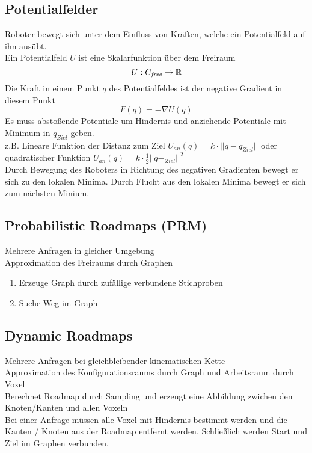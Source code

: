 \subsection{Potentialfelder}%
\label{bwp:sub:potentialfelder}
Roboter bewegt sich unter dem Einfluss von Kräften, welche ein Potentialfeld auf ihn ausübt.\\
Ein Potentialfeld \(U\) ist eine Skalarfunktion über dem Freiraum \[U: C_{\mathit{free}} \rightarrow \mathbb{R}\]
Die Kraft in einem Punkt \(q\) des Potentialfeldes ist der negative Gradient in diesem Punkt
\[F(q) = - \nabla U(q)\]
Es muss abstoßende Potentiale um Hindernis und anziehende Potentiale mit Minimum in \(q_{\mathit{Ziel}}\) geben.\\
z.B. Lineare Funktion der Distanz zum Ziel \( U_{\mathit{an}}(q) = k \cdot || q - q_{\mathit{Ziel}} ||\)
oder quadratischer Funktion \(U_{\mathit{an}}(q) = k \cdot \frac{1}{2} {|| q - _{\mathit{Ziel}}||}^2\)\\
Durch Bewegung des Roboters in Richtung des negativen Gradienten bewegt er sich zu den lokalen Minima.
Durch Flucht aus den lokalen Minima bewegt er sich zum nächsten Minium.


\subsection{Probabilistic Roadmaps (PRM)}%
\label{bwp:sub:probabilistic-roadmaps}
Mehrere Anfragen in gleicher Umgebung\\
Approximation des Freiraums durch Graphen
\begin{enumerate}
\item Erzeuge Graph durch zufällige verbundene Stichproben
\item Suche Weg im Graph
\end{enumerate}

\subsection{Dynamic Roadmaps}%
\label{bwp:sub:dynamic-roadmaps}
Mehrere Anfragen bei gleichbleibender kinematischen Kette\\
Approximation des Konfigurationsraums durch Graph und Arbeitsraum durch Voxel\\

Berechnet Roadmap durch Sampling und erzeugt eine Abbildung zwichen den Knoten/Kanten und allen Voxeln\\
Bei einer Anfrage müssen alle Voxel mit Hindernis bestimmt werden und die Kanten / Knoten aus der Roadmap entfernt werden.
Schließlich werden Start und Ziel im Graphen verbunden.\\


